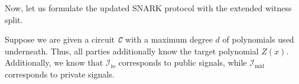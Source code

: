 \documentclass[../lecture-notes.tex]{subfiles}
\begin{document}
Now, let us formulate the updated SNARK protocol with the extended witness split.

\begin{tcolorbox}[title=Attempt \#4: Sound SNARK for Public/Private Inputs,
    colback=blue!5!white,
    colframe=blue!75!black,
    colbacktitle=blue!25!white,
    coltitle=blue!20!black,
    fonttitle=\bfseries,
    boxrule=1.25pt,
    subtitle style={boxrule=0pt,
    colback=blue!20!white,
    colupper=blue!75!gray} ]

    Suppose we are given a circuit $\textit{\texttt{C}}$ with a maximum degree $d$ of polynomials used underneath. Thus, all parties additionally know the target polynomial $Z(x)$. \textcolor{green!50!black}{Additionally, we know that $\mathcal{I}_{\text{io}}$ corresponds to public signals, while $\mathcal{I}_{\text{mid}}$ corresponds to private signals.}


\end{tcolorbox}
\end{document}
